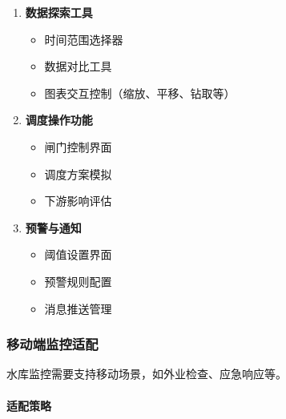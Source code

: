 \begin{enumerate}
\def\labelenumi{\arabic{enumi}.}
\tightlist
\item
  \textbf{数据探索工具}

  \begin{itemize}
  \tightlist
  \item
    时间范围选择器
  \item
    数据对比工具
  \item
    图表交互控制（缩放、平移、钻取等）
  \end{itemize}
\item
  \textbf{调度操作功能}

  \begin{itemize}
  \tightlist
  \item
    闸门控制界面
  \item
    调度方案模拟
  \item
    下游影响评估
  \end{itemize}
\item
  \textbf{预警与通知}

  \begin{itemize}
  \tightlist
  \item
    阈值设置界面
  \item
    预警规则配置
  \item
    消息推送管理
  \end{itemize}
\end{enumerate}

\subsubsection{移动端监控适配}\label{ux79fbux52a8ux7aefux76d1ux63a7ux9002ux914d}

水库监控需要支持移动场景，如外业检查、应急响应等。

\paragraph{适配策略}\label{ux9002ux914dux7b56ux7565}

